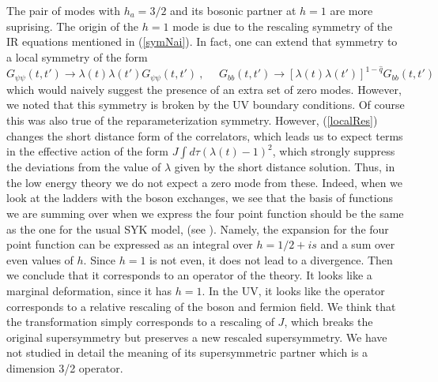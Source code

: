 \documentclass[aps,pre,preprint,onecolumn,citeautoscript,superscriptaddress,nofootinbib,eqsecnum]{revtex4-1}
\def\nref#1{(\ref{#1})}
\def\be{\begin{equation}}
\def\ee{\end{equation}}
\def\la{\label}
\begin{document}
The pair of modes with $h_{a}=3/2$ and its bosonic partner at $h=1$ are more suprising. The origin of the $h=1$ mode is due
to the rescaling symmetry of the IR equations mentioned in \nref{symNai}.  In fact, one can extend that symmetry to a local symmetry of the form
\be \la{localRes}
G_{\psi \psi}(t,t') \to \lambda(t)\lambda(t') G_{\psi \psi}(t,t') ~,~~~~~~ G_{bb}(t,t') \to [ \lambda(t) \lambda(t')]^{ 1 -\hat q } G_{bb}(t,t')
\ee
 which would naively suggest the
presence of an extra set of zero modes. %
However, we noted that this symmetry is broken by the UV boundary conditions. Of course this was also true of the reparameterization symmetry.
However, \nref{localRes}    changes the short distance form of the correlators, which leads us to expect terms in the effective action of the form 
$J \int d\tau (\lambda(t) - 1)^2$, which strongly suppress the deviations from the value of $\lambda$ given by the   short distance solution.  
Thus, in the low energy theory we do not expect a zero mode from these.
Indeed, when we look at the ladders with the boson exchanges, we see  that the basis of functions we are summing over when we express the four point function
should be the same as the one for the usual SYK model, (see \cite{JMDS16}). Namely, the expansion for the four point function can be expressed as an integral 
over $h=1/2 + i s$ and a sum over even values of $h$.   Since $h=1$ is not even, it does not lead
to a divergence. Then we conclude that it corresponds to an operator of the theory. 
  It  looks like a marginal deformation, since it has  $h=1$.  In the UV, it looks like the operator corresponds to a relative rescaling of the boson and fermion field. 
  We think that the transformation simply corresponds to a rescaling of $J$, which breaks the original supersymmetry but preserves a new rescaled supersymmetry. 
  We have not studied in detail the meaning of its supersymmetric partner which is a dimension 3/2 operator. 
  
 
\end{document}
